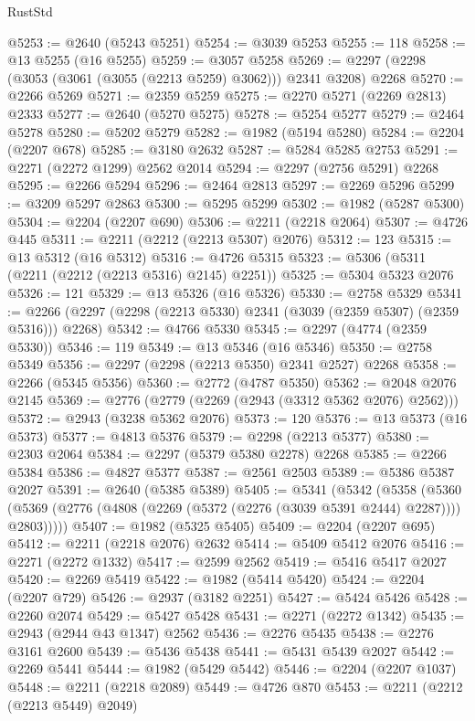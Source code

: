 \begin{lexlean}{RustStd}
\begin{coremodule}
{\begin{coremodule}
{{{{{{{{{{{{{{{{{{{{{{{{{{{{{{{{{{{{{{{{{{{{{{{{{{{{{{@5253 := @2640 (@5243 @5251)
@5254 := @3039 @5253
@5255 := 118
@5258 := @13 @5255 (@16 @5255)
@5259 := @3057 @5258
@5269 := @2297 (@2298 (@3053 (@3061 (@3055 (@2213 @5259) @3062))) @2341 @3208) @2268
@5270 := @2266 @5269
@5271 := @2359 @5259
@5275 := @2270 @5271 (@2269 @2813) @2333
@5277 := @2640 (@5270 @5275)
@5278 := @5254 @5277
@5279 := @2464 @5278
@5280 := @5202 @5279
@5282 := @1982 (@5194 @5280)
@5284 := @2204 (@2207 @678)
@5285 := @3180 @2632
@5287 := @5284 @5285 @2753
@5291 := @2271 (@2272 @1299) @2562 @2014
@5294 := @2297 (@2756 @5291) @2268
@5295 := @2266 @5294
@5296 := @2464 @2813
@5297 := @2269 @5296
@5299 := @3209 @5297 @2863
@5300 := @5295 @5299
@5302 := @1982 (@5287 @5300)
@5304 := @2204 (@2207 @690)
@5306 := @2211 (@2218 @2064)
@5307 := @4726 @445
@5311 := @2211 (@2212 (@2213 @5307) @2076)
@5312 := 123
@5315 := @13 @5312 (@16 @5312)
@5316 := @4726 @5315
@5323 := @5306 (@5311 (@2211 (@2212 (@2213 @5316) @2145) @2251))
@5325 := @5304 @5323 @2076
@5326 := 121
@5329 := @13 @5326 (@16 @5326)
@5330 := @2758 @5329
@5341 := @2266 (@2297 (@2298 (@2213 @5330) @2341 (@3039 (@2359 @5307) (@2359 @5316))) @2268)
@5342 := @4766 @5330
@5345 := @2297 (@4774 (@2359 @5330))
@5346 := 119
@5349 := @13 @5346 (@16 @5346)
@5350 := @2758 @5349
@5356 := @2297 (@2298 (@2213 @5350) @2341 @2527) @2268
@5358 := @2266 (@5345 @5356)
@5360 := @2772 (@4787 @5350)
@5362 := @2048 @2076 @2145
@5369 := @2776 (@2779 (@2269 (@2943 (@3312 @5362 @2076) @2562)))
@5372 := @2943 (@3238 @5362 @2076)
@5373 := 120
@5376 := @13 @5373 (@16 @5373)
@5377 := @4813 @5376
@5379 := @2298 (@2213 @5377)
@5380 := @2303 @2064
@5384 := @2297 (@5379 @5380 @2278) @2268
@5385 := @2266 @5384
@5386 := @4827 @5377
@5387 := @2561 @2503
@5389 := @5386 @5387 @2027
@5391 := @2640 (@5385 @5389)
@5405 := @5341
    (@5342
      (@5358
        (@5360 (@5369 (@2776 (@4808 (@2269 (@5372 (@2276 (@3039 @5391 @2444) @2287)))) @2803)))))
@5407 := @1982 (@5325 @5405)
@5409 := @2204 (@2207 @695)
@5412 := @2211 (@2218 @2076) @2632
@5414 := @5409 @5412 @2076
@5416 := @2271 (@2272 @1332)
@5417 := @2599 @2562
@5419 := @5416 @5417 @2027
@5420 := @2269 @5419
@5422 := @1982 (@5414 @5420)
@5424 := @2204 (@2207 @729)
@5426 := @2937 (@3182 @2251)
@5427 := @5424 @5426
@5428 := @2260 @2074
@5429 := @5427 @5428
@5431 := @2271 (@2272 @1342)
@5435 := @2943 (@2944 @43 @1347) @2562
@5436 := @2276 @5435
@5438 := @2276 @3161 @2600
@5439 := @5436 @5438
@5441 := @5431 @5439 @2027
@5442 := @2269 @5441
@5444 := @1982 (@5429 @5442)
@5446 := @2204 (@2207 @1037)
@5448 := @2211 (@2218 @2089)
@5449 := @4726 @870
@5453 := @2211 (@2212 (@2213 @5449) @2049)
}}}}}}}}}}}}}}}}}}}}}}}}}}}}}}}}}}}}}}}}}}}}}}}}}}}}}}
\end{coremodule}}
\end{coremodule}
\end{lexlean}
